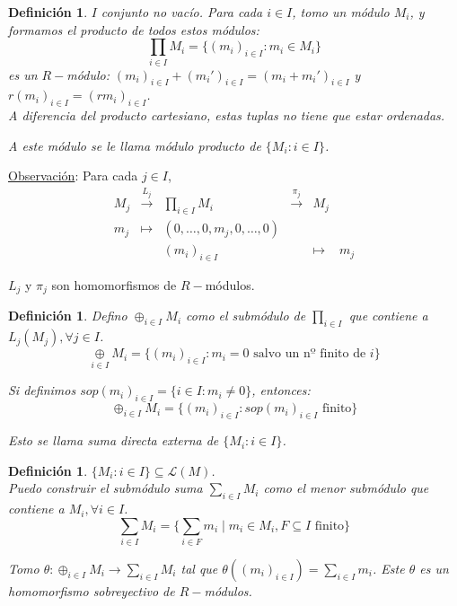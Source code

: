 \documentclass[11pt,a4paper]{article}
\theoremstyle{break}
\newtheorem{definition}[theorem]{Definición}
\begin{document}
\begin{definition}
$I$ conjunto no vacío. Para cada $i \in I$, tomo un módulo $M_{i}$, y formamos el producto de todos estos módulos:
$$\prod_{i \in I} M_{i} = \{(m_{i})_{i \in I}: m_{i} \in M_{i}\}$$
es un $R-$módulo: $(m_{i})_{i \in I} + (m_{i}')_{i \in I} = (m_{i} + m_{i}')_{i \in I}$ y $r(m_{i})_{i \in I} = (rm_{i})_{i \in I}$. \\
A diferencia del producto cartesiano, estas tuplas no tiene que estar ordenadas.

A este módulo se le llama módulo producto de $\{M_{i}: i \in I\}$.
\end{definition}

\underline{Observación}: Para cada $j \in I$,
$$\begin{aligned}
M_{j} & \overset{L_{j}}{\to} & \prod_{i \in I} M_{i} & \overset{\pi_{j}}{\to} & M_{j} \\
m_{j} & \mapsto & (0,\dots, 0, m_{j}, 0, \dots, 0) & & & \\
        &                & (m_{i})_{i \in I} & & \mapsto & m_{j} 
\end{aligned}$$

$L_{j}$ y $\pi_{j}$ son homomorfismos de $R-$módulos.

\begin{definition}
Defino $\oplus_{i \in I} M_{i}$ como el submódulo de $\prod_{i \in I}$ que contiene a $L_{j}(M_{j}), \forall j \in I$.
$$\underset{i \in I}{\oplus} M_{i} = \{(m_{i})_{i \in I}: m_{i} = 0 \text{ salvo un nº finito de } i \}$$

Si definimos $sop(m_{i})_{i \in I} = \{i \in I: m_{i} \neq 0\}$, entonces:
$$\oplus_{i \in I} M_{i} = \{(m_{i})_{i \in I}: sop(m_{i})_{i \in I} \text{ finito}\}$$

Esto se llama suma directa externa de $\{M_{i}: i \in I\}$.
\end{definition}

\begin{definition}
$\{M_{i}: i \in I\} \subseteq \mathcal{L}(M)$. \\
Puedo construir el submódulo suma $\sum\limits_{i \in I}M_{i}$ como el menor submódulo que contiene a $M_{i}, \forall i \in I$.
$$\sum_{i \in I} M_{i} = \{ \sum_{i \in F} m_{i} \mid m_{i} \in M_{i}, F \subseteq I \text{ finito}\}$$

Tomo $\theta: \oplus_{i \in I} M_{i} \to \sum\limits_{i \in I} M_{i}$ tal que $\theta((m_{i})_{i \in I}) = \sum\limits_{i \in I} m_{i}$. Este $\theta$ es un homomorfismo sobreyectivo de $R-$módulos.
\end{definition}
\end{document}
